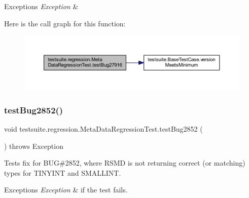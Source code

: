 \begin{DoxyExceptions}{Exceptions}
{\em Exception} & \\
\hline
\end{DoxyExceptions}
Here is the call graph for this function\+:
\nopagebreak
\begin{figure}[H]
\begin{center}
\leavevmode
\includegraphics[width=350pt]{classtestsuite_1_1regression_1_1_meta_data_regression_test_a360ac39f54be19d70c9d43f584bc6f0f_cgraph}
\end{center}
\end{figure}
\mbox{\label{classtestsuite_1_1regression_1_1_meta_data_regression_test_a37ae44d17afdb072e212dace2d333db9}} 
\subsubsection{\texorpdfstring{test\+Bug2852()}{testBug2852()}}
{\footnotesize\ttfamily void testsuite.\+regression.\+Meta\+Data\+Regression\+Test.\+test\+Bug2852 (\begin{DoxyParamCaption}{ }\end{DoxyParamCaption}) throws Exception}

Tests fix for B\+UG\#2852, where R\+S\+MD is not returning correct (or matching) types for T\+I\+N\+Y\+I\+NT and S\+M\+A\+L\+L\+I\+NT.


\begin{DoxyExceptions}{Exceptions}
{\em Exception} & if the test fails. \\
\hline
\end{DoxyExceptions}
\mbox{\label{classtestsuite_1_1regression_1_1_meta_data_regression_test_a7575c81c706f7b3eb33eafce244b371a}} 
